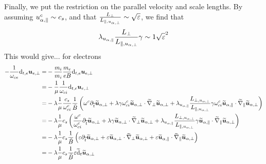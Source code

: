 Finally, we put the restriction on the parallel velocity and scale lengths.
By assuming $u^c_{\alpha,\|}\sim c_s$, and that $\frac{L_{\perp}}{L_{\|, u_{\alpha,\perp}}}\sim \sqrt{\varepsilon}$, we find that
%
\begin{align*}
 \lambda_{u_{\alpha,\|}}
 \frac{L_{\perp}}{L_{\|, u_{\alpha,\perp}}}
 \gamma
 \sim
 1
 \sqrt{\varepsilon}^2
\end{align*}
%
This would give...
for electrons
%
\begin{align*}
    - \frac{1}{\omega_{ce}}\text{d}_{t,e} \boldsymbol{u}_{e,\perp}
    =&
    - \frac{m_i}{m_i} \frac{m_e}{eB}\text{d}_{t,e} \boldsymbol{u}_{e,\perp}
    \\
    =&
    - \frac{1}{\mu} \frac{1}{\omega_{ci}}\text{d}_{t,e} \boldsymbol{u}_{e,\perp}
    \\
    =&
    - \lambda
 \frac{1}{\mu}
 \frac{c_s}{\omega^c_{ci}}
 \frac{1}{\tilde{B}}
 \left(
 \omega^c
 \partial_{\widetilde{ t}} \widetilde{ \boldsymbol{u}}_{\alpha,\perp}
 +
 \lambda
 \gamma
 \omega^c_{ci}
 \widetilde{ \boldsymbol{u}}_{\alpha,\perp}\cdot\widetilde{ \nabla}_\perp\widetilde{ \boldsymbol{u}}_{\alpha,\perp}
 +
 \lambda_{u_{\alpha,\|}}
 \frac{L_{\perp, u_{\alpha,\perp}}}{L_{\|, u_{\alpha,\perp}}}
 \gamma
 \omega^c_{ci}
 \widetilde{ \boldsymbol{u}}_{\alpha,\|}\cdot\widetilde{ \nabla}_\|\widetilde{ \boldsymbol{u}}_{\alpha,\perp}
 \right)
    \\
    =&
    -\lambda
 \frac{1}{\mu}
 c_s
 \left(
 \frac{\omega^c}{\omega^c_{ci}}
 \partial_{\widetilde{ t}} \widetilde{ \boldsymbol{u}}_{\alpha,\perp}
 +
 \lambda
 \gamma
 \widetilde{ \boldsymbol{u}}_{\alpha,\perp}\cdot\widetilde{ \nabla}_\perp\widetilde{ \boldsymbol{u}}_{\alpha,\perp}
 +
 \lambda_{u_{\alpha,\|}}
 \frac{L_{\perp, u_{\alpha,\perp}}}{L_{\|, u_{\alpha,\perp}}}
 \gamma
 \widetilde{ \boldsymbol{u}}_{\alpha,\|}\cdot\widetilde{ \nabla}_\|\widetilde{ \boldsymbol{u}}_{\alpha,\perp}
 \right)
   \\
    =&
    -\lambda
 \frac{1}{\mu}
 c_s
 \frac{1}{\tilde{B}}
 \left(
 \varepsilon
 \partial_{\widetilde{ t}} \widetilde{ \boldsymbol{u}}_{\alpha,\perp}
 +
 \varepsilon
 \widetilde{ \boldsymbol{u}}_{\alpha,\perp}\cdot\widetilde{ \nabla}_\perp\widetilde{ \boldsymbol{u}}_{\alpha,\perp}
 +
 \varepsilon
 \widetilde{ \boldsymbol{u}}_{\alpha,\|}\cdot\widetilde{ \nabla}_\|\widetilde{ \boldsymbol{u}}_{\alpha,\perp}
 \right)
  \\
    =&
    -\lambda
 \frac{1}{\mu}
 c_s
 \frac{1}{\tilde{B}}
 \varepsilon \widetilde{ \text{d}}_{t}\widetilde{ \boldsymbol{u}}_{\alpha,\perp}
\end{align*}



